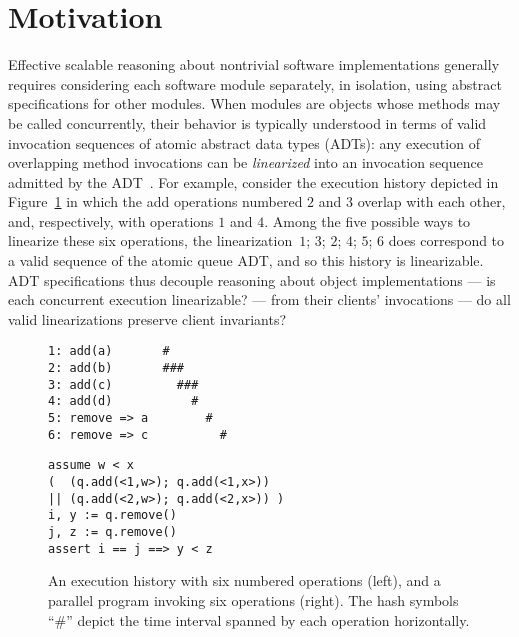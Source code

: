 \section{Motivation}
\label{sec:motivation}

Effective scalable reasoning about nontrivial software implementations generally
requires considering each software module separately, in isolation, using
abstract specifications for other modules. When modules are objects whose
methods may be called concurrently, their behavior is typically understood in
terms of valid invocation sequences of atomic abstract data types (ADTs): any
execution of overlapping method invocations can be \emph{linearized} into an
invocation sequence admitted by the ADT~\cite{journals/toplas/HerlihyW90}. For
example, consider the execution history depicted in Figure~\ref{fig:clients} in
which the add operations numbered $2$ and $3$ overlap with each other, and,
respectively, with operations $1$ and $4$. Among the five possible ways to
linearize these six operations, the linearization~$1$; $3$; $2$; $4$; $5$; $6$
does correspond to a valid sequence of the atomic queue ADT, and so this history
is linearizable. ADT specifications thus decouple reasoning about object
implementations — is each concurrent execution linearizable? — from their
clients’ invocations — do all valid linearizations preserve client invariants?

\begin{figure}
  \begin{minipage}{0.43\linewidth}
    \begin{verbatim}
1: add(a)       #
2: add(b)       ###
3: add(c)         ###
4: add(d)           #
5: remove => a        #
6: remove => c          #
    \end{verbatim}
  \end{minipage}
  \hfill
  \begin{minipage}{0.55\linewidth}
    \begin{verbatim}
assume w < x
(  (q.add(<1,w>); q.add(<1,x>))
|| (q.add(<2,w>); q.add(<2,x>)) )
i, y := q.remove()
j, z := q.remove()
assert i == j ==> y < z
    \end{verbatim}
  \end{minipage}
  \caption{An execution history with six numbered operations (left),
    and a parallel program invoking six operations (right). The hash symbols
    “\#” depict the time interval spanned by each operation horizontally.}
  \label{fig:clients}
\end{figure}

